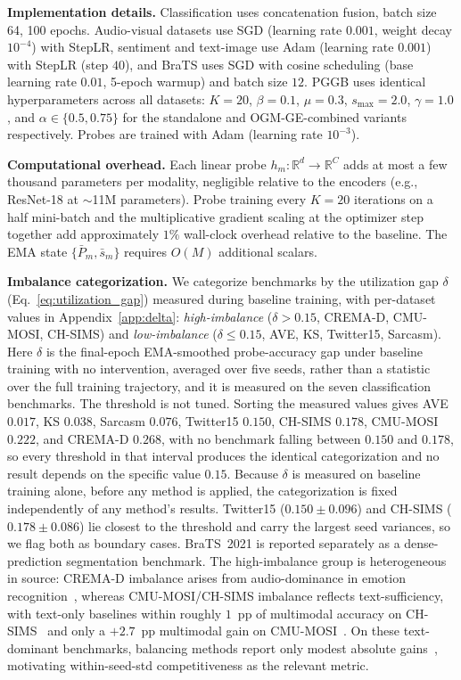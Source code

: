 \documentclass{article}
\newcommand{\probe}{h}
\begin{document}
\textbf{Implementation details.}
Classification uses concatenation fusion, batch size 64, 100 epochs. Audio-visual datasets use SGD (learning rate $0.001$, weight decay $10^{-4}$) with StepLR, sentiment and text-image use Adam (learning rate $0.001$) with StepLR (step $40$), and BraTS uses SGD with cosine scheduling (base learning rate $0.01$, 5-epoch warmup) and batch size $12$. PGGB uses identical hyperparameters across all datasets: $K{=}20$, $\beta{=}0.1$, $\mu{=}0.3$, $s_{\max}{=}2.0$, $\gamma{=}1.0$, and $\alpha \in \{0.5, 0.75\}$ for the standalone and OGM-GE-combined variants respectively. Probes are trained with Adam (learning rate $10^{-3}$).

\textbf{Computational overhead.} Each linear probe $\probe_m\colon \mathbb{R}^d \to \mathbb{R}^C$ adds at most a few thousand parameters per modality, negligible relative to the encoders (e.g., ResNet-18 at $\sim$11M parameters). Probe training every $K{=}20$ iterations on a half mini-batch and the multiplicative gradient scaling at the optimizer step together add approximately $1\%$ wall-clock overhead relative to the baseline. The EMA state $\{\bar{P}_m, \bar{s}_m\}$ requires $O(M)$ additional scalars.

\textbf{Imbalance categorization.}
\label{sec:imbalance_cat}
We categorize benchmarks by the utilization gap $\delta$ (Eq.~\eqref{eq:utilization_gap}) measured during baseline training, with per-dataset values in Appendix~\ref{app:delta}: \emph{high-imbalance} ($\delta > 0.15$, CREMA-D, CMU-MOSI, CH-SIMS) and \emph{low-imbalance} ($\delta \leq 0.15$, AVE, KS, Twitter15, Sarcasm). Here $\delta$ is the final-epoch EMA-smoothed probe-accuracy gap under baseline training with no intervention, averaged over five seeds, rather than a statistic over the full training trajectory, and it is measured on the seven classification benchmarks. The threshold is not tuned. Sorting the measured values gives AVE $0.017$, KS $0.038$, Sarcasm $0.076$, Twitter15 $0.150$, CH-SIMS $0.178$, CMU-MOSI $0.222$, and CREMA-D $0.268$, with no benchmark falling between $0.150$ and $0.178$, so every threshold in that interval produces the identical categorization and no result depends on the specific value $0.15$. Because $\delta$ is measured on baseline training alone, before any method is applied, the categorization is fixed independently of any method's results. Twitter15 ($0.150 \pm 0.096$) and CH-SIMS ($0.178 \pm 0.086$) lie closest to the threshold and carry the largest seed variances, so we flag both as boundary cases. BraTS~2021 is reported separately as a dense-prediction segmentation benchmark. The high-imbalance group is heterogeneous in source: CREMA-D imbalance arises from audio-dominance in emotion recognition~\citep{peng2022ogmge}, whereas CMU-MOSI/CH-SIMS imbalance reflects text-sufficiency, with text-only baselines within roughly $1$~pp of multimodal accuracy on CH-SIMS~\citep{liu2022chsimsv2} and only a $+2.7$~pp multimodal gain on CMU-MOSI~\citep{wei2025dgl}. On these text-dominant benchmarks, balancing methods report only modest absolute gains~\citep{guo2024cggm,wei2024opm}, motivating within-seed-std competitiveness as the relevant metric.
\end{document}

